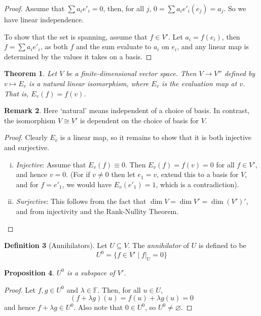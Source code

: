 \documentclass[10pt,fleqn]{article}
\newcommand{\field}{\mathbb{F}}
\theoremstyle{definition} \newtheorem{defn}{Definition}[section]
\theoremstyle{plain}      \newtheorem{thm}[defn]{Theorem}
\theoremstyle{plain}      \newtheorem{prop}[defn]{Proposition}
\theoremstyle{plain}      \newtheorem{lem}[defn]{Lemma}
\theoremstyle{plain}      \newtheorem{cor}[defn]{Corollary}
\theoremstyle{plain}      \newtheorem{ad}[defn]{Addendum}
\theoremstyle{definition} \newtheorem{ex}[defn]{Example}
\theoremstyle{definition} \newtheorem{rem}[defn]{Remark}
\numberwithin{equation}{subsection}
\begin{document}
\begin{proof}
    Assume that $\sum a_ie'_i=0$, then, for all $j$, $0=\sum a_ie'_i(e_j)=a_j$.
    So we have linear independence.

    To show that the set is spanning, assume that $f\in V'$.
    Let $a_i=f(e_i)$, then $f=\sum a_ie'_i$, as both $f$ and the sum evaluate to $a_i$ on $e_i$, and any linear map is determined by the values it takes on a basis.
\end{proof}

\begin{thm}
    Let $V$ be a finite-dimensional vector space.
    Then $V\to V''$ defined by $v\mapsto E_v$ is a natural linear isomorphism, where $E_v$ is the evaluation map at $v$.
    That is, $E_v(f)=f(v)$.
\end{thm}

\begin{rem}
    Here `natural' means independent of a choice of basis.
    In contrast, the isomorphism $V\cong V'$ is dependent on the choice of basis for $V$.
\end{rem}

\begin{proof}
    Clearly $E_v$ is a linear map, so it remains to show that it is both injective and surjective.
    \begin{enumerate}[(i)]
        \item\emph{Injective}:
        Assume that $E_v(f)\equiv0$.
        Then $E_v(f)=f(v)=0$ for all $f\in V'$, and hence $v=0$.
        (For if $v\neq0$ then let $e_1=v$, extend this to a basis for $V$, and for $f=e'_1$, we would have $E_v(e'_1)=1$, which is a contradiction).
        \item\emph{Surjective}:
        This follows from the fact that $\dim V=\dim V'=\dim (V')'$, and from injectivity and the Rank-Nullity Theorem.
    \end{enumerate}
\end{proof}

\begin{defn}[Annihilators]
    Let $U\subseteq V$.
    The \emph{annihilator} of $U$ is defined to be
    \[
        U^0=
        \{f\in V'\mid f|_U=0\}
    \]
\end{defn}

\begin{prop}
    $U^0$ is a subspace of $V'$.
\end{prop}

\begin{proof}
    Let $f,g\in U^0$ and $\lambda\in\field$.
    Then, for all $u\in U$,
    \[
        (f+\lambda g)(u)=
        f(u)+\lambda g(u)=
        0
    \]
    and hence $f+\lambda g\in U^0$.
    Also note that $0\in U^0$, so $U^0\neq\varnothing$.
\end{proof}
\end{document}
